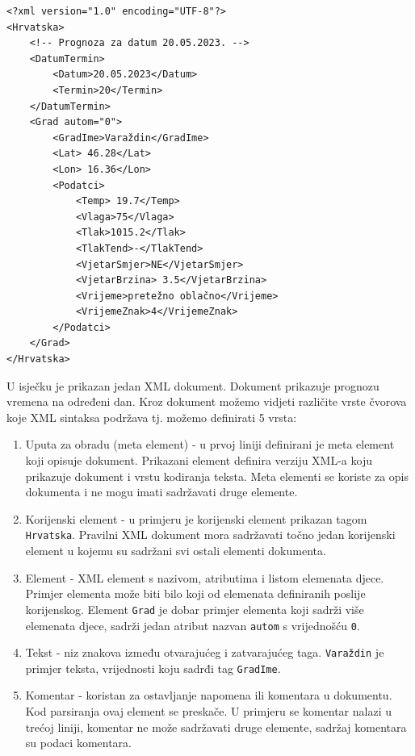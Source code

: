 \documentclass{foi}
\begin{document}
\begin{lstlisting}[caption={Vrste čvorova}]
<?xml version="1.0" encoding="UTF-8"?>
<Hrvatska>
    <!-- Prognoza za datum 20.05.2023. -->
    <DatumTermin>
        <Datum>20.05.2023</Datum>
        <Termin>20</Termin>
    </DatumTermin>
    <Grad autom="0">
        <GradIme>Varaždin</GradIme>
        <Lat> 46.28</Lat>
        <Lon> 16.36</Lon>
        <Podatci>
            <Temp> 19.7</Temp>
            <Vlaga>75</Vlaga>
            <Tlak>1015.2</Tlak>
            <TlakTend>-</TlakTend>
            <VjetarSmjer>NE</VjetarSmjer>
            <VjetarBrzina> 3.5</VjetarBrzina>
            <Vrijeme>pretežno oblačno</Vrijeme>
            <VrijemeZnak>4</VrijemeZnak>
        </Podatci>
    </Grad>
</Hrvatska>
\end{lstlisting}

U isječku je prikazan jedan XML dokument. Dokument prikazuje prognozu vremena
na određeni dan. Kroz dokument možemo vidjeti različite vrste čvorova koje XML
sintaksa podržava tj. možemo definirati 5 vrsta:
\begin{enumerate}
	\item Uputa za obradu (meta element) - u prvoj liniji definirani je meta element koji
	      opisuje dokument. Prikazani element definira verziju XML-a koju prikazuje dokument
	      i vrstu kodiranja teksta. Meta elementi se koriste za opis dokumenta i ne mogu imati
	      sadržavati druge elemente.
	\item Korijenski element - u primjeru je korijenski element prikazan tagom \texttt{Hrvatska}.
	      Pravilni XML dokument mora sadržavati točno jedan korijenski element u kojemu su sadržani
	      svi ostali elementi dokumenta.
	\item Element - XML element s nazivom, atributima i listom elemenata djece. Primjer
	      elementa može biti bilo koji od elemenata definiranih poslije korijenskog. Element
	      \texttt{Grad} je dobar primjer elementa koji sadrži više elemenata djece, sadrži
	      jedan atribut nazvan \texttt{autom} s vrijednošću \texttt{0}.
	\item Tekst - niz znakova između otvarajućeg i zatvarajućeg taga. \texttt{Varaždin} je
	      primjer teksta, vrijednosti koju sadrđi tag \texttt{GradIme}.
	\item Komentar - koristan za ostavljanje napomena ili komentara u dokumentu. Kod parsiranja
	      ovaj element se preskače. U primjeru se komentar nalazi u trećoj liniji, komentar ne može
	      sadržavati druge elemente, sadržaj komentara su podaci komentara.
\end{enumerate}
\end{document}
